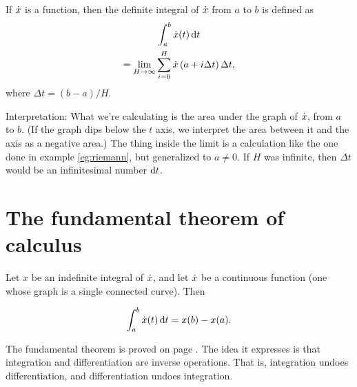 \begin{important}
If $\dot{x}$ is a function, then the definite integral of $\dot{x}$ from $a$ to $b$ is
defined as
\begin{multline*}
  \int_{a}^{b} \dot{x}(t) \operatorname{d\!} t \\
= \lim_{H\rightarrow\infty} \sum_{i=0}^{H} \dot{x}\left(a+i\Delta t\right)\Delta t,
\end{multline*}
where $\Delta t=(b-a)/H$.

Interpretation: What we're calculating is
the area under the graph of $\dot{x}$, from $a$ to $b$. (If the graph dips below the $t$ axis, we interpret the
area between it and the axis as a negative area.)
The thing inside the limit is a calculation like the one done in example \ref{eg:riemann},
but generalized to $a\ne 0$.
If $H$ was infinite, then $\Delta t$ would be an infinitesimal number $\operatorname{d\!} t$. 
\end{important}

\section{The fundamental theorem of calculus}

\begin{important}
Let $x$ be an indefinite integral of $\dot{x}$, and let $\dot{x}$ be a continuous
function (one whose graph is a single connected curve). Then

\begin{equation*}
  \int_{a}^{b} \dot{x}(t) \operatorname{d\!} t = x(b)-x(a).
\end{equation*}
\end{important}

The fundamental theorem is proved on page \pageref{detour:fundamental-thm-proof}.
The idea it expresses is that integration and differentiation are inverse operations.
That is, integration undoes differentiation, and differentiation undoes integration.

